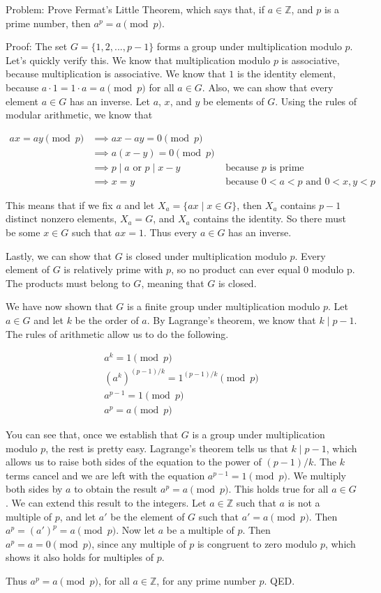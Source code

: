 Problem: Prove Fermat's Little Theorem, which says that, if $a \in \mathbb{Z}$, and $p$ is a prime number, then $a^p = a \pmod p$.

Proof: The set $G = \{1,2,...,p-1\}$ forms a group under multiplication modulo $p$. Let's quickly verify this. We know that multiplication modulo $p$ is associative, because multiplication is associative. We know that $1$ is the identity element, because $a \cdot 1 = 1 \cdot a = a \pmod p$ for all $a \in G$. Also, we can show that every element $a \in G$ has an inverse. Let $a$, $x$, and $y$ be elements of $G$. Using the rules of modular arithmetic, we know that

\begin{align*}
ax = ay \pmod p &\implies ax - ay = 0 \pmod p \\
&\implies a(x-y) = 0 \pmod p \\
&\implies p \mid a \textrm{ or } p \mid x - y &\textrm{ because $p$ is prime} \\
&\implies x = y &\textrm{ because $0 < a < p$ and $0 < x, y < p$}
\end{align*}

This means that if we fix $a$ and let $X_a = \{ax \mid x \in G\}$, then $X_a$ contains $p-1$ distinct nonzero elements, $X_a = G$, and $X_a$ contains the identity. So there must be some $x \in G$ such that $ax = 1$. Thus every $a \in G$ has an inverse.

Lastly, we can show that $G$ is closed under multiplication modulo $p$. Every element of $G$ is relatively prime with $p$, so no product can ever equal $0$ modulo p. The products must belong to $G$, meaning that $G$ is closed.

We have now shown that $G$ is a finite group under multiplication modulo $p$. Let $a \in G$ and let $k$ be the order of $a$. By Lagrange's theorem, we know that $k \mid p-1$. The rules of arithmetic allow us to do the following.

\begin{align*}
a^k = 1 \pmod p \\
(a^k)^{(p-1)/k} = 1^{(p-1)/k} \pmod p \\
a^{p-1} = 1 \pmod p \\
a^p = a \pmod p
\end{align*}

You can see that, once we establish that $G$ is a group under multiplication modulo $p$, the rest is pretty easy. Lagrange's theorem tells us that $k \mid p-1$, which allows us to raise both sides of the equation to the power of $(p-1)/k$. The $k$ terms cancel and we are left with the equation $a^{p-1} = 1 \pmod p$. We multiply both sides by $a$ to obtain the result $a^p = a \pmod p$. This holds true for all $a \in G$. We can extend this result to the integers. Let $a \in \mathbb{Z}$ such that $a$ is not a multiple of $p$, and let $a'$ be the element of $G$ such that $a' = a \pmod p$. Then $a^p = (a')^p = a \pmod p$. Now let $a$ be a multiple of $p$. Then $a^p = a = 0 \pmod p$, since any multiple of $p$ is congruent to zero modulo $p$, which shows it also holds for multiples of $p$.

Thus $a^p = a \pmod p$, for all $a \in \mathbb{Z}$, for any prime number $p$. QED.
